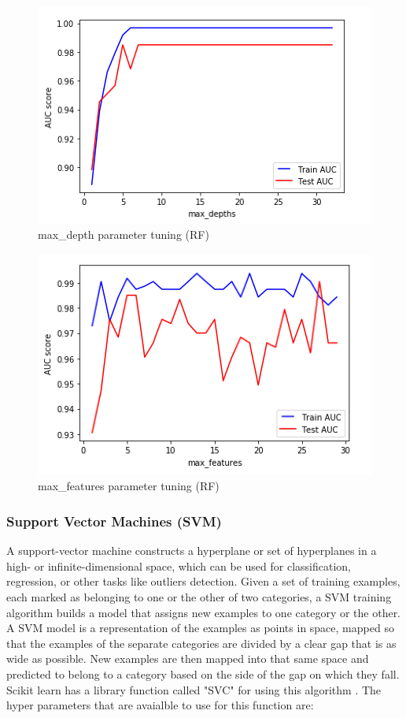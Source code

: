 \documentclass[journal]{IEEEtran}
\begin{document}
\begin{figure}[htbp]
	\centering
	\includegraphics[width=\linewidth]{maxDepth_RF.png}
	\caption{max\_depth parameter tuning (RF)}
	\label{Fig:rf2}
\end{figure}

\begin{figure}[H]
	\centering
	\includegraphics[width=\linewidth]{maxFeatures_RF.png}
	\caption{max\_features parameter tuning (RF)}
	\label{Fig:rf3}
\end{figure}


\subsubsection{Support Vector Machines (SVM)}
A support-vector machine constructs a hyperplane or set of hyperplanes in a high- or infinite-dimensional space, which can be used for classification, regression, or other tasks like outliers detection. Given a set of training examples, each marked as belonging to one or the other of two categories, a SVM training algorithm builds a model that assigns new examples to one category or the other. A SVM model is a representation of the examples as points in space, mapped so that the examples of the separate categories are divided by a clear gap that is as wide as possible. New examples are then mapped into that same space and predicted to belong to a category based on the side of the gap on which they fall. Scikit learn has a library function called "SVC" for using this algorithm \cite{SVM}. The hyper parameters that are avaialble to use for this function are:\\
\end{document}
